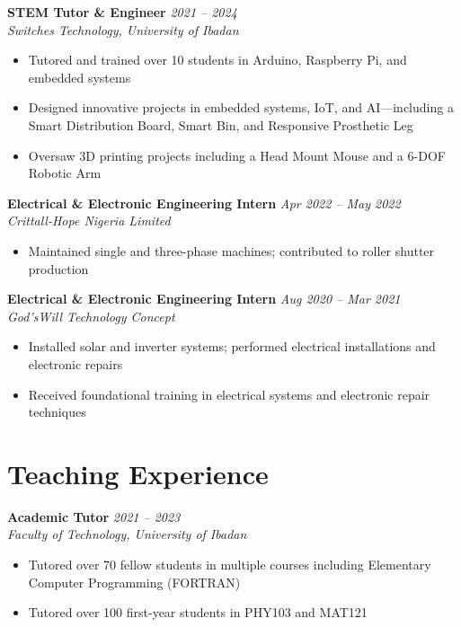 \documentclass[10pt, a4paper]{article}
\newcommand{\cventry}[4]{%
  \noindent\textbf{#1} \hfill \textit{#2}\\%
  \textit{#3} \hfill \small{#4}\\[-4pt]%
}
\begin{document}
\vspace{4pt}
\cventry{STEM Tutor \& Engineer}{2021 -- 2024}{Switches Technology, University of Ibadan}{}
\begin{itemize}
  \item Tutored and trained over 10 students in Arduino, Raspberry Pi, and embedded systems
  \item Designed innovative projects in embedded systems, IoT, and AI---including a Smart Distribution Board, Smart Bin, and Responsive Prosthetic Leg
  \item Oversaw 3D printing projects including a Head Mount Mouse and a 6-DOF Robotic Arm
\end{itemize}

\vspace{4pt}
\cventry{Electrical \& Electronic Engineering Intern}{Apr 2022 -- May 2022}{Crittall-Hope Nigeria Limited}{}
\begin{itemize}
  \item Maintained single and three-phase machines; contributed to roller shutter production
\end{itemize}

\vspace{4pt}
\cventry{Electrical \& Electronic Engineering Intern}{Aug 2020 -- Mar 2021}{God'sWill Technology Concept}{}
\begin{itemize}
  \item Installed solar and inverter systems; performed electrical installations and electronic repairs
  \item Received foundational training in electrical systems and electronic repair techniques
\end{itemize}

\section{Teaching Experience}

\cventry{Academic Tutor}{2021 -- 2023}{Faculty of Technology, University of Ibadan}{}
\begin{itemize}
  \item Tutored over 70 fellow students in multiple courses including Elementary Computer Programming (FORTRAN)
  \item Tutored over 100 first-year students in PHY103 and MAT121
\end{itemize}
\end{document}
